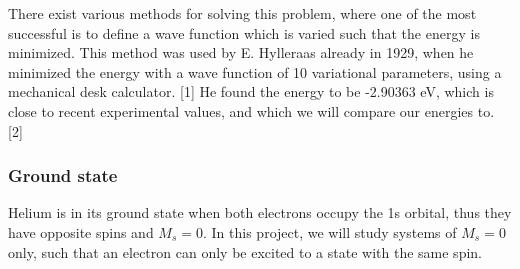 There exist various methods for solving this problem, where one of the most successful is to define a wave function which is varied such that the energy is minimized. This method was used by E. Hylleraas already in 1929, when he minimized the energy with a wave function of 10 variational parameters, using a mechanical desk calculator. [1] He found the energy to be -2.90363 eV, which is close to recent experimental values, and which we will compare our energies to. [2] 

\subsubsection{Ground state}
Helium is in its ground state when both electrons occupy the 1s orbital, thus they have opposite spins and $M_s=0$. In this project, we will study systems of $M_s=0$ only, such that an electron can only be excited to a state with the same spin. 

